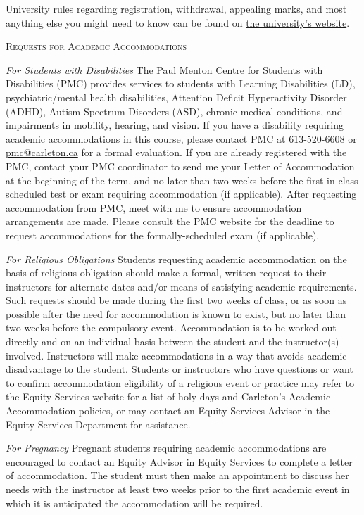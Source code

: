\documentclass[12pt]{article}
\begin{document}
University rules regarding registration, withdrawal, appealing marks, and most anything else you might need to know can be found on \href{http://www.carleton.ca/cu0708uc/regulations/acadregsuniv.html}{the university's website}.

{\large \textsc{Requests for Academic Accommodations}}

\textit{For Students with Disabilities} The Paul Menton Centre for Students with Disabilities (PMC) provides services to students with Learning Disabilities (LD), psychiatric/mental health disabilities, Attention Deficit Hyperactivity Disorder (ADHD), Autism Spectrum Disorders (ASD), chronic medical conditions, and impairments in mobility, hearing, and vision. If you have a disability requiring academic accommodations in this course, please contact PMC at 613-520-6608 or \href{mailto:pmc@carleton.ca}{pmc@carleton.ca} for a formal evaluation. If you are already registered with the PMC, contact your PMC coordinator to send me your Letter of Accommodation at the beginning of the term, and no later than two weeks before the first in-class scheduled test or exam requiring accommodation (if applicable). After requesting accommodation from PMC, meet with me to ensure accommodation arrangements are made. Please consult the PMC website for the deadline to request accommodations for the formally-scheduled exam (if applicable).

\textit{For Religious Obligations} Students requesting academic accommodation on the basis of religious obligation should make a formal, written request to their instructors for alternate dates and/or means of satisfying academic requirements. Such requests should be made during the first two weeks of class, or as soon as possible after the need for accommodation is known to exist, but no later than two weeks before the compulsory event. Accommodation is to be worked out directly and on an individual basis between the student and the instructor(s) involved. Instructors will make accommodations in a way that avoids academic disadvantage to the student. Students or instructors who have questions or want to confirm accommodation eligibility of a religious event or practice may refer to the Equity Services website for a list of holy days and Carleton's Academic Accommodation policies, or may contact an Equity Services Advisor in the Equity Services Department for assistance.

\textit{For Pregnancy} Pregnant students requiring academic accommodations are encouraged to contact an Equity Advisor in Equity Services to complete a letter of accommodation. The student must then make an appointment to discuss her needs with the instructor at least two weeks prior to the first academic event in which it is anticipated the accommodation will be required.
\end{document}
